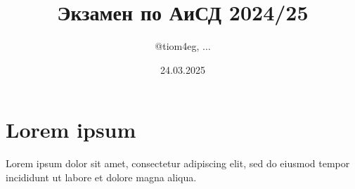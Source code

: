 \documentclass{article}
\title{Экзамен по АиСД 2024/25}
\author{@tiom4eg, $\dots$}
\date{24.03.2025}
\begin{document}
\maketitle

\section*{Lorem ipsum}

Lorem ipsum dolor sit amet, consectetur adipiscing elit, sed do eiusmod tempor incididunt ut labore et dolore magna aliqua.
\end{document}
